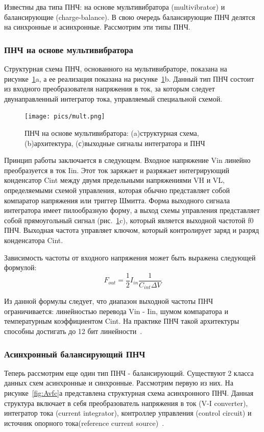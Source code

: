 \documentclass[a4paper,12pt,oneside]{scrartcl}
\begin{document}
Известны  два типа ПНЧ: на основе мультивибратора (multivibrator) и балансирующие (charge-balance). В свою очередь балансирующие ПНЧ делятся на синхронные и асинхронные. Рассмотрим эти типы ПНЧ.








\subsubsection{ПНЧ на основе мультивибратора}

Структурная схема ПНЧ, основанного на мультивибраторе, показана на рисунке~\ref{fig:Mult}a, а ее реализация показана на рисунке~\ref{fig:Mult}b. Данный тип ПНЧ состоит из входного преобразователя напряжения в ток, за которым следует двунаправленный интегратор тока, управляемый специальной схемой. 

\begin{figure}[!htb]
    \centering
    \texttt{[image: pics/mult.png]}
    \caption{ПНЧ на основе мультивибратора: (a)структурная схема, (b)архитектура, (с)выходные сигналы интегратора и ПНЧ}
    \label{fig:Mult}
\end{figure}

Принцип работы заключается в следующем. Входное напряжение Vin линейно преобразуется в ток Iin. Этот ток заряжает и разряжает интегрирующий конденсатор Cint между двумя предельными напряжениями VH и VL, определяемыми схемой управления, которая обычно представляет собой компаратор напряжения или триггер Шмитта. Форма выходного сигнала интегратора имеет пилообразную форму, а выход схемы управления представляет собой прямоугольный сигнал (рис.~\ref{fig:Mult}c), который является выходной частотой f0 ПНЧ. Выходная частота управляет ключом, который контролирует заряд и разряд конденсатора Cint.

Зависимость частоты  от входного напряжения может быть выражена следующей формулой:
$$F_{out} = \frac{1}{2} I_{in} \frac{1}{C_{int}\Delta V}$$

Из данной формулы следует, что диапазон выходной частоты ПНЧ ограничивается: линейностью перевода Vin - Iin, шумом компаратора и температурным коэффициентом Cint. На практике ПНЧ такой архитектуры способны достигать до 12 бит линейности~\cite{B3}.








\subsubsection{Асинхронный балансирующий ПНЧ}
Теперь рассмотрим еще один тип ПНЧ - балансирующий. Существуют 2 класса данных схем асинхронные и синхронные. Рассмотрим первую из них. На рисунке~\ref{fig:Avfc}а представлена структурная схема асинхронного ПНЧ. Данная структура включает в себя преобразователь напряжения в ток (V-I converter), интегратор тока (current integrator), контроллер управления (control circuit) и источник опорного тока(reference current source)~\cite{B3}.
\end{document}
